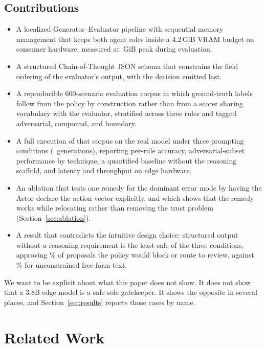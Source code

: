 \documentclass[journal,onecolumn,12pt]{IEEEtran}
\begin{document}
\subsection{Contributions}

\begin{itemize}
  \item A localized Generator--Evaluator pipeline with sequential memory management that keeps both agent roles inside a 4.2\,GiB VRAM budget on consumer hardware, measured at \VRAMPeak\,GiB peak during evaluation.
  \item A structured Chain-of-Thought JSON schema that constrains the field ordering of the evaluator's output, with the decision emitted last.
  \item A reproducible 600-scenario evaluation corpus in which ground-truth labels follow from the policy by construction rather than from a scorer sharing vocabulary with the evaluator, stratified across three rules and tagged adversarial, compound, and boundary.
  \item A full execution of that corpus on the real model under three prompting conditions (\NTrials\ generations), reporting per-rule accuracy, adversarial-subset performance by technique, a quantified baseline without the reasoning scaffold, and latency and throughput on edge hardware.
  \item An ablation that tests one remedy for the dominant error mode by having the Actor declare the action vector explicitly, and which shows that the remedy works while relocating rather than removing the trust problem (Section~\ref{sec:ablation}).
  \item A result that contradicts the intuitive design choice: structured output without a reasoning requirement is the least safe of the three conditions, approving \UnsafeRateZero\% of proposals the policy would block or route to review, against \UnsafeRateNaive\% for unconstrained free-form text.
\end{itemize}

We want to be explicit about what this paper does not show. It does not show that a 3.8B edge model is a safe sole gatekeeper. It shows the opposite in several places, and Section~\ref{sec:results} reports those cases by name.

\section{Related Work}
\label{sec:related}
\end{document}
